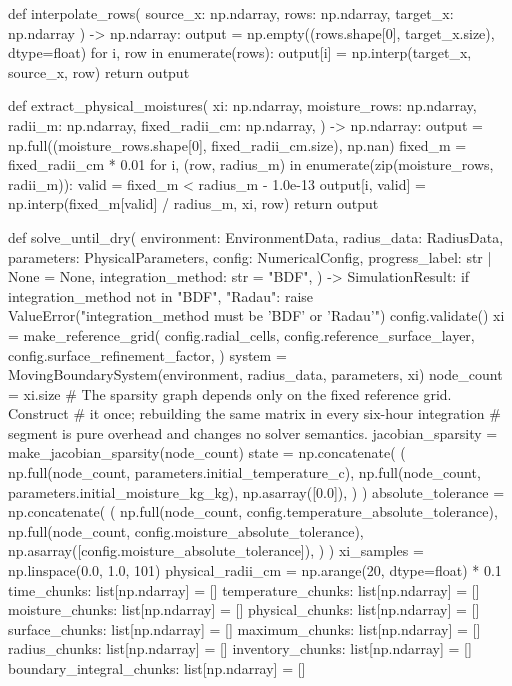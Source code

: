 \documentclass[withoutpreface,bwprint]{cumcmthesis}
\begin{document}
\begin{PythonCode}
def interpolate_rows(
    source_x: np.ndarray, rows: np.ndarray, target_x: np.ndarray
) -> np.ndarray:
    output = np.empty((rows.shape[0], target_x.size), dtype=float)
    for i, row in enumerate(rows):
        output[i] = np.interp(target_x, source_x, row)
    return output


def extract_physical_moistures(
    xi: np.ndarray,
    moisture_rows: np.ndarray,
    radii_m: np.ndarray,
    fixed_radii_cm: np.ndarray,
) -> np.ndarray:
    output = np.full((moisture_rows.shape[0], fixed_radii_cm.size), np.nan)
    fixed_m = fixed_radii_cm * 0.01
    for i, (row, radius_m) in enumerate(zip(moisture_rows, radii_m)):
        valid = fixed_m < radius_m - 1.0e-13
        output[i, valid] = np.interp(fixed_m[valid] / radius_m, xi, row)
    return output


def solve_until_dry(
    environment: EnvironmentData,
    radius_data: RadiusData,
    parameters: PhysicalParameters,
    config: NumericalConfig,
    progress_label: str | None = None,
    integration_method: str = "BDF",
) -> SimulationResult:
    if integration_method not in {"BDF", "Radau"}:
        raise ValueError("integration_method must be 'BDF' or 'Radau'")
    config.validate()
    xi = make_reference_grid(
        config.radial_cells,
        config.reference_surface_layer,
        config.surface_refinement_factor,
    )
    system = MovingBoundarySystem(environment, radius_data, parameters, xi)
    node_count = xi.size
    # The sparsity graph depends only on the fixed reference grid.  Construct
    # it once; rebuilding the same matrix in every six-hour integration
    # segment is pure overhead and changes no solver semantics.
    jacobian_sparsity = make_jacobian_sparsity(node_count)
    state = np.concatenate(
        (
            np.full(node_count, parameters.initial_temperature_c),
            np.full(node_count, parameters.initial_moisture_kg_kg),
            np.asarray([0.0]),
        )
    )
    absolute_tolerance = np.concatenate(
        (
            np.full(node_count, config.temperature_absolute_tolerance),
            np.full(node_count, config.moisture_absolute_tolerance),
            np.asarray([config.moisture_absolute_tolerance]),
        )
    )
    xi_samples = np.linspace(0.0, 1.0, 101)
    physical_radii_cm = np.arange(20, dtype=float) * 0.1
    time_chunks: list[np.ndarray] = []
    temperature_chunks: list[np.ndarray] = []
    moisture_chunks: list[np.ndarray] = []
    physical_chunks: list[np.ndarray] = []
    surface_chunks: list[np.ndarray] = []
    maximum_chunks: list[np.ndarray] = []
    radius_chunks: list[np.ndarray] = []
    inventory_chunks: list[np.ndarray] = []
    boundary_integral_chunks: list[np.ndarray] = []


\end{PythonCode}
\end{document}
